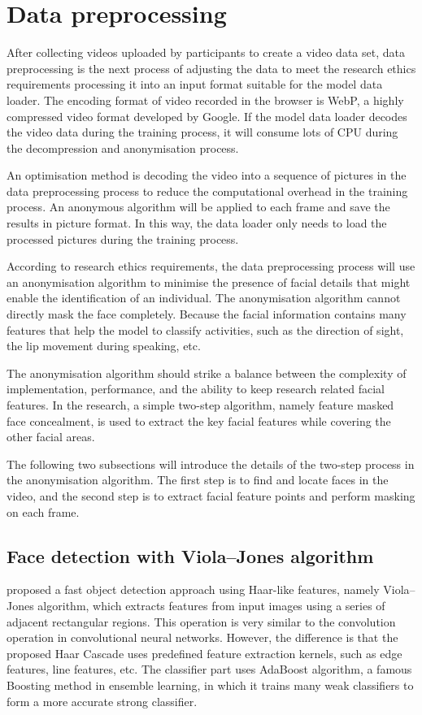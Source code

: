 \section{Data preprocessing}
\label{sec:Data preprocessing} %
After collecting videos uploaded by participants to create a video data set, data preprocessing is the next process of adjusting the data to meet the research ethics requirements processing it into an input format suitable for the model data loader.
The encoding format of video recorded in the browser is WebP, a highly compressed video format developed by Google.
If the model data loader decodes the video data during the training process, it will consume lots of CPU during the decompression and anonymisation process.

An optimisation method is decoding the video into a sequence of pictures in the data preprocessing process to reduce the computational overhead in the training process.
An anonymous algorithm will be applied to each frame and save the results in picture format.
In this way, the data loader only needs to load the processed pictures during the training process.

According to research ethics requirements, the data preprocessing process will use an anonymisation algorithm to minimise the presence of facial details that might enable the identification of an individual.
The anonymisation algorithm cannot directly mask the face completely.
Because the facial information contains many features that help the model to classify activities, such as the direction of sight, the lip movement during speaking, etc.

The anonymisation algorithm should strike a balance between the complexity of implementation, performance, and the ability to keep research related facial features.
In the research, a simple two-step algorithm, namely feature masked face concealment, is used to extract the key facial features while covering the other facial areas.

The following two subsections will introduce the details of the two-step process in the anonymisation algorithm.
The first step is to find and locate faces in the video, and the second step is to extract facial feature points and perform masking on each frame.

\subsection{Face detection with Viola--Jones algorithm} %
\citet{viola2001rapid} proposed a fast object detection approach using Haar-like features, namely Viola--Jones algorithm, which extracts features from input images using a series of adjacent rectangular regions.
This operation is very similar to the convolution operation in convolutional neural networks.
However, the difference is that the proposed Haar Cascade uses predefined feature extraction kernels, such as edge features, line features, etc.
The classifier part uses AdaBoost algorithm, a famous Boosting method in ensemble learning, in which it trains many weak classifiers to form a more accurate strong classifier.

